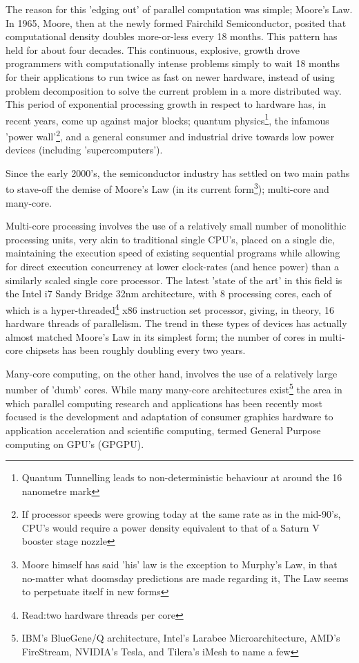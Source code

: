 The reason for this 'edging out' of parallel computation was simple; Moore's Law\cite{Moo65}. In 1965, Moore, then at the newly formed Fairchild Semiconductor, posited that computational density doubles more-or-less every 18 months. This pattern has held for about four decades. This continuous, explosive, growth drove programmers with computationally intense problems simply to wait 18 months for their applications to run twice as fast on newer hardware, instead of using problem decomposition to solve the current problem in a more distributed way. This period of exponential processing growth in respect to hardware has, in recent years, come up against major blocks; quantum physics\footnote{Quantum Tunnelling leads to non-deterministic behaviour at around the 16 nanometre mark\cite{Zhi03}}, the infamous 'power wall'\footnote{If processor speeds were growing today at the same rate as in the mid-90's, CPU's would require a power density equivalent to that of a Saturn V booster stage nozzle\cite{Rab07}}, and a general consumer and industrial drive towards low power devices (including 'supercomputers').

Since the early 2000's, the semiconductor industry has settled on two main paths to stave-off the demise of Moore's Law (in its current form\footnote{Moore himself has said 'his' law is the exception to Murphy's Law, in that no-matter what doomsday predictions are made regarding it, The Law seems to perpetuate itself in new forms}); multi-core and many-core. 

Multi-core processing involves the use of a relatively small number of monolithic processing units, very akin to traditional single CPU's, placed on a single die, maintaining the execution speed of existing sequential programs while allowing for direct execution concurrency at lower clock-rates (and hence power) than a similarly scaled single core processor. The latest 'state of the art' in this field is the Intel i7 Sandy Bridge 32nm architecture, with 8 processing cores\cite{Var11}, each of which is a hyper-threaded\footnote{Read:two hardware threads per core} x86 instruction set processor, giving, in theory, 16 hardware threads of parallelism. The trend in these types of devices has actually almost matched Moore's Law in its simplest form; the number of cores in multi-core chipsets has been roughly doubling every two years.

Many-core computing, on the other hand, involves the use of a relatively large number of 'dumb' cores. While many many-core architectures exist\footnote{IBM's BlueGene/Q architecture, Intel's Larabee Microarchitecture, AMD's FireStream, NVIDIA's Tesla, and Tilera's iMesh to name a few} the area in which parallel computing research and applications has been recently most focused is the development and adaptation of consumer graphics hardware to application acceleration and scientific computing, termed General Purpose computing on GPU's (GPGPU).

